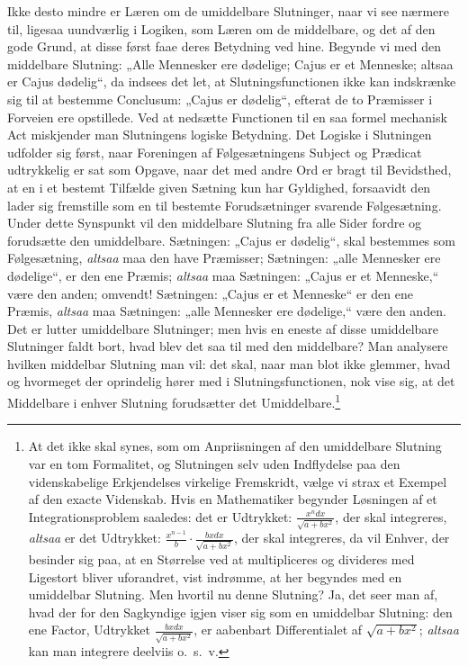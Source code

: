 \documentclass[12pt]{book}
\newcommand{\opage}[1]{\marginnote{\footnotesize\textit{[#1]}}}
\begin{document}
Ikke desto mindre er Læren om de umiddelbare Slutninger,
naar vi see nærmere til, ligesaa uundværlig i Logiken,
som Læren om de middelbare, og det af den gode Grund, at
disse først faae deres Betydning ved hine. Begynde vi med
den middelbare Slutning: „Alle Mennesker ere dødelige; Cajus
er et Menneske; altsaa er Cajus dødelig“, da indsees det let,
at Slutningsfunctionen ikke kan indskrænke sig til at bestemme
Conclusum: „Cajus er dødelig“, efterat de to Præmisser i
Forveien ere opstillede. Ved at nedsætte Functionen til en
saa formel mechanisk Act miskjender man Slutningens logiske
Betydning. Det Logiske i Slutningen udfolder sig først, naar
Foreningen af Følgesætningens Subject og Prædicat udtrykkelig
er sat som Opgave, naar det med andre Ord er bragt til
Bevidsthed, at en i et bestemt Tilfælde given Sætning kun
har Gyldighed, forsaavidt den lader sig fremstille som en til
bestemte Forudsætninger svarende Følgesætning. Under dette
Synspunkt vil den middelbare Slutning fra alle Sider
fordre og forudsætte den umiddelbare. Sætningen: „Cajus
er dødelig“, skal bestemmes som Følgesætning, \emph{altsaa} maa
den have Præmisser; Sætningen: „alle Mennesker ere dødelige“,
er den ene Præmis; \emph{altsaa} maa Sætningen: „Cajus
er et Menneske,“ være den anden; omvendt! Sætningen:
„Cajus er et Menneske“ er den ene Præmis, \emph{altsaa} maa
Sætningen: „alle Mennesker ere dødelige,“ være den anden.
Det er lutter umiddelbare Slutninger; men hvis en eneste af
disse umiddelbare Slutninger faldt bort, hvad blev det saa til
med den middelbare? Man analysere hvilken middelbar
Slut\opage{296}ning man vil: det skal, naar man blot ikke glemmer, hvad
og hvormeget der oprindelig hører med i Slutningsfunctionen,
nok vise sig, at det Middelbare i enhver Slutning forudsætter
det Umiddelbare.\footnote{At det ikke skal synes, som om Anpriisningen af den umiddelbare
Slutning var en tom Formalitet, og Slutningen selv uden Indflydelse
paa den videnskabelige Erkjendelses virkelige Fremskridt,
vælge vi strax et Exempel af den exacte Videnskab. Hvis en Mathematiker
begynder Løsningen af et Integrationsproblem saaledes:
det er Udtrykket: $\frac{x^{n}dx}{\sqrt{a+bx^{2}}}$, der skal integreres, \emph{altsaa} er det
Udtrykket: $\frac{x^{n-1}}{b}\cdot\frac{bxdx}{\sqrt{a+bx^{2}}}$, der skal integreres, da vil Enhver,
der besinder sig paa, at en Størrelse ved at multipliceres og divideres
med Ligestort bliver uforandret, vist indrømme, at her begyndes
med en umiddelbar Slutning. Men hvortil nu denne
Slutning? Ja, det seer man af, hvad der for den Sagkyndige
igjen viser sig som en umiddelbar Slutning: den ene Factor,
Udtrykket $\frac{bxdx}{\sqrt{a+bx^{2}}}$, er aabenbart Differentialet af $\sqrt{a+bx^{2}}$;
\emph{altsaa} kan man integrere deelviis o.~s.~v.}%
\end{document}
